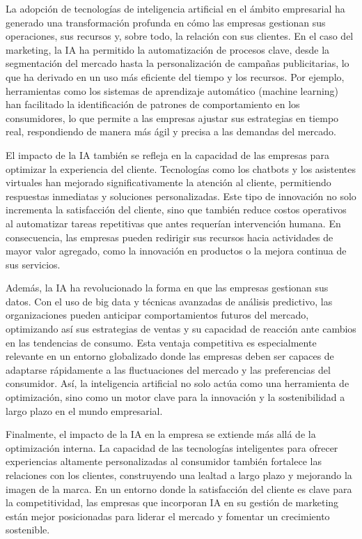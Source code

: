 \documentclass[9pt]{article}
\begin{document}
La adopción de tecnologías de inteligencia artificial en el ámbito empresarial ha generado una transformación profunda en cómo las empresas gestionan sus operaciones, sus recursos y, sobre todo, la relación con sus clientes. En el caso del marketing, la IA ha permitido la automatización de procesos clave, desde la segmentación del mercado hasta la personalización de campañas publicitarias, lo que ha derivado en un uso más eficiente del tiempo y los recursos. Por ejemplo, herramientas como los sistemas de aprendizaje automático (machine learning) han facilitado la identificación de patrones de comportamiento en los consumidores, lo que permite a las empresas ajustar sus estrategias en tiempo real, respondiendo de manera más ágil y precisa a las demandas del mercado.

El impacto de la IA también se refleja en la capacidad de las empresas para optimizar la experiencia del cliente. Tecnologías como los chatbots y los asistentes virtuales han mejorado significativamente la atención al cliente, permitiendo respuestas inmediatas y soluciones personalizadas. Este tipo de innovación no solo incrementa la satisfacción del cliente, sino que también reduce costos operativos al automatizar tareas repetitivas que antes requerían intervención humana. En consecuencia, las empresas pueden redirigir sus recursos hacia actividades de mayor valor agregado, como la innovación en productos o la mejora continua de sus servicios.

Además, la IA ha revolucionado la forma en que las empresas gestionan sus datos. Con el uso de big data y técnicas avanzadas de análisis predictivo, las organizaciones pueden anticipar comportamientos futuros del mercado, optimizando así sus estrategias de ventas y su capacidad de reacción ante cambios en las tendencias de consumo. Esta ventaja competitiva es especialmente relevante en un entorno globalizado donde las empresas deben ser capaces de adaptarse rápidamente a las fluctuaciones del mercado y las preferencias del consumidor. Así, la inteligencia artificial no solo actúa como una herramienta de optimización, sino como un motor clave para la innovación y la sostenibilidad a largo plazo en el mundo empresarial.

Finalmente, el impacto de la IA en la empresa se extiende más allá de la optimización interna. La capacidad de las tecnologías inteligentes para ofrecer experiencias altamente personalizadas al consumidor también fortalece las relaciones con los clientes, construyendo una lealtad a largo plazo y mejorando la imagen de la marca. En un entorno donde la satisfacción del cliente es clave para la competitividad, las empresas que incorporan IA en su gestión de marketing están mejor posicionadas para liderar el mercado y fomentar un crecimiento sostenible.
\end{document}
